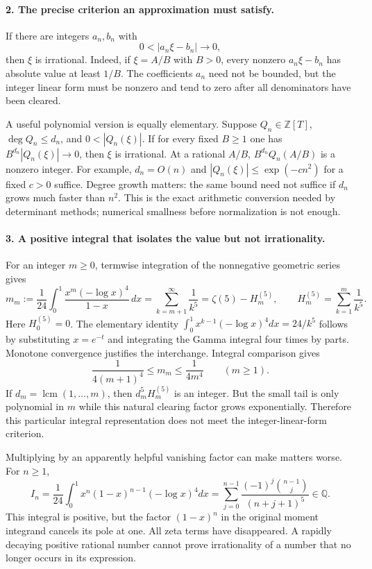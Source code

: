 \documentclass[11pt]{article}
\begin{document}
\paragraph{2. The precise criterion an approximation must satisfy.}
If there are integers $a_n,b_n$ with
\[
 0<|a_n\xi-b_n|\longrightarrow0,
\]
then $\xi$ is irrational. Indeed, if $\xi=A/B$ with $B>0$, every nonzero $a_n\xi-b_n$ has absolute value at least $1/B$. The coefficients $a_n$ need not be bounded, but the integer linear form must be nonzero and tend to zero after all denominators have been cleared.

A useful polynomial version is equally elementary. Suppose $Q_n\in\mathbb Z[T]$, $\deg Q_n\leq d_n$, and $0<|Q_n(\xi)|$. If for every fixed $B\geq1$ one has $B^{d_n}|Q_n(\xi)|\to0$, then $\xi$ is irrational. At a rational $A/B$, $B^{d_n}Q_n(A/B)$ is a nonzero integer. For example, $d_n=O(n)$ and $|Q_n(\xi)|\leq\exp(-c n^2)$ for a fixed $c>0$ suffice. Degree growth matters: the same bound need not suffice if $d_n$ grows much faster than $n^2$. This is the exact arithmetic conversion needed by determinant methods; numerical smallness before normalization is not enough.

\paragraph{3. A positive integral that isolates the value but not irrationality.}
For an integer $m\geq0$, termwise integration of the nonnegative geometric series gives
\[
 m_m:=\frac1{24}\int_0^1\frac{x^m(-\log x)^4}{1-x}\,dx
 =\sum_{k=m+1}^{\infty}\frac1{k^5}
 =\zeta(5)-H_m^{(5)},
 \qquad H_m^{(5)}=\sum_{k=1}^{m}\frac1{k^5}.
\]
Here $H_0^{(5)}=0$. The elementary identity $\int_0^1x^{k-1}(-\log x)^4dx=24/k^5$ follows by substituting $x=e^{-t}$ and integrating the Gamma integral four times by parts. Monotone convergence justifies the interchange. Integral comparison gives
\[
 \frac1{4(m+1)^4}\leq m_m\leq\frac1{4m^4}\qquad(m\geq1).
\]
If $d_m=\operatorname{lcm}(1,\ldots,m)$, then $d_m^5H_m^{(5)}$ is an integer. But the small tail is only polynomial in $m$ while this natural clearing factor grows exponentially. Therefore this particular integral representation does not meet the integer-linear-form criterion.

Multiplying by an apparently helpful vanishing factor can make matters worse. For $n\geq1$,
\[
 I_n=\frac1{24}\int_0^1x^n(1-x)^{n-1}(-\log x)^4dx
 =\sum_{j=0}^{n-1}\frac{(-1)^j{n-1\choose j}}{(n+j+1)^5}\in\mathbb Q.
\]
This integral is positive, but the factor $(1-x)^n$ in the original moment integrand cancels its pole at one. All zeta terms have disappeared. A rapidly decaying positive rational number cannot prove irrationality of a number that no longer occurs in its expression.
\end{document}
